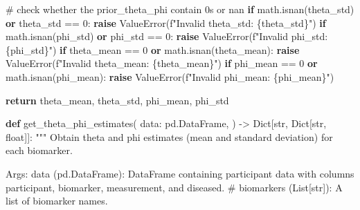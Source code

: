 \documentclass[
  letterpaper,
  DIV=11,
  numbers=noendperiod]{scrreprt}
\newenvironment{Shaded}{\begin{snugshade}}{\end{snugshade}}
\newcommand{\BuiltInTok}[1]{\textcolor[rgb]{0.00,0.23,0.31}{#1}}
\newcommand{\CommentTok}[1]{\textcolor[rgb]{0.37,0.37,0.37}{#1}}
\newcommand{\ControlFlowTok}[1]{\textcolor[rgb]{0.00,0.23,0.31}{\textbf{#1}}}
\newcommand{\DecValTok}[1]{\textcolor[rgb]{0.68,0.00,0.00}{#1}}
\newcommand{\KeywordTok}[1]{\textcolor[rgb]{0.00,0.23,0.31}{\textbf{#1}}}
\newcommand{\NormalTok}[1]{\textcolor[rgb]{0.00,0.23,0.31}{#1}}
\newcommand{\OperatorTok}[1]{\textcolor[rgb]{0.37,0.37,0.37}{#1}}
\newcommand{\PreprocessorTok}[1]{\textcolor[rgb]{0.68,0.00,0.00}{#1}}
\newcommand{\SpecialCharTok}[1]{\textcolor[rgb]{0.37,0.37,0.37}{#1}}
\newcommand{\SpecialStringTok}[1]{\textcolor[rgb]{0.13,0.47,0.30}{#1}}
\begin{document}
\begin{Shaded}
\begin{Highlighting}[]
    \CommentTok{\# check whether the prior\_theta\_phi contain 0s or nan}
    \ControlFlowTok{if}\NormalTok{ math.isnan(theta\_std) }\KeywordTok{or}\NormalTok{ theta\_std }\OperatorTok{==} \DecValTok{0}\NormalTok{:}
        \ControlFlowTok{raise} \PreprocessorTok{ValueError}\NormalTok{(}\SpecialStringTok{f"Invalid theta\_std: }\SpecialCharTok{\{}\NormalTok{theta\_std}\SpecialCharTok{\}}\SpecialStringTok{"}\NormalTok{)}
    \ControlFlowTok{if}\NormalTok{ math.isnan(phi\_std) }\KeywordTok{or}\NormalTok{ phi\_std }\OperatorTok{==} \DecValTok{0}\NormalTok{:}
        \ControlFlowTok{raise} \PreprocessorTok{ValueError}\NormalTok{(}\SpecialStringTok{f"Invalid phi\_std: }\SpecialCharTok{\{}\NormalTok{phi\_std}\SpecialCharTok{\}}\SpecialStringTok{"}\NormalTok{)}
    \ControlFlowTok{if}\NormalTok{ theta\_mean }\OperatorTok{==} \DecValTok{0} \KeywordTok{or}\NormalTok{ math.isnan(theta\_mean):}
        \ControlFlowTok{raise} \PreprocessorTok{ValueError}\NormalTok{(}\SpecialStringTok{f"Invalid theta\_mean: }\SpecialCharTok{\{}\NormalTok{theta\_mean}\SpecialCharTok{\}}\SpecialStringTok{"}\NormalTok{)}
    \ControlFlowTok{if}\NormalTok{ phi\_mean }\OperatorTok{==} \DecValTok{0} \KeywordTok{or}\NormalTok{ math.isnan(phi\_mean):}
        \ControlFlowTok{raise} \PreprocessorTok{ValueError}\NormalTok{(}\SpecialStringTok{f"Invalid phi\_mean: }\SpecialCharTok{\{}\NormalTok{phi\_mean}\SpecialCharTok{\}}\SpecialStringTok{"}\NormalTok{)}

    \ControlFlowTok{return}\NormalTok{ theta\_mean, theta\_std, phi\_mean, phi\_std}

\KeywordTok{def}\NormalTok{ get\_theta\_phi\_estimates(}
\NormalTok{    data: pd.DataFrame,}
\NormalTok{) }\OperatorTok{{-}\textgreater{}}\NormalTok{ Dict[}\BuiltInTok{str}\NormalTok{, Dict[}\BuiltInTok{str}\NormalTok{, }\BuiltInTok{float}\NormalTok{]]:}
    \CommentTok{"""}
\CommentTok{    Obtain theta and phi estimates (mean and standard deviation) for each biomarker.}

\CommentTok{    Args:}
\CommentTok{    data (pd.DataFrame): DataFrame containing participant data with columns \textquotesingle{}participant\textquotesingle{}, }
\CommentTok{        \textquotesingle{}biomarker\textquotesingle{}, \textquotesingle{}measurement\textquotesingle{}, and \textquotesingle{}diseased\textquotesingle{}.}
\CommentTok{    \# biomarkers (List[str]): A list of biomarker names.}


\end{Highlighting}
\end{Shaded}
\end{document}
